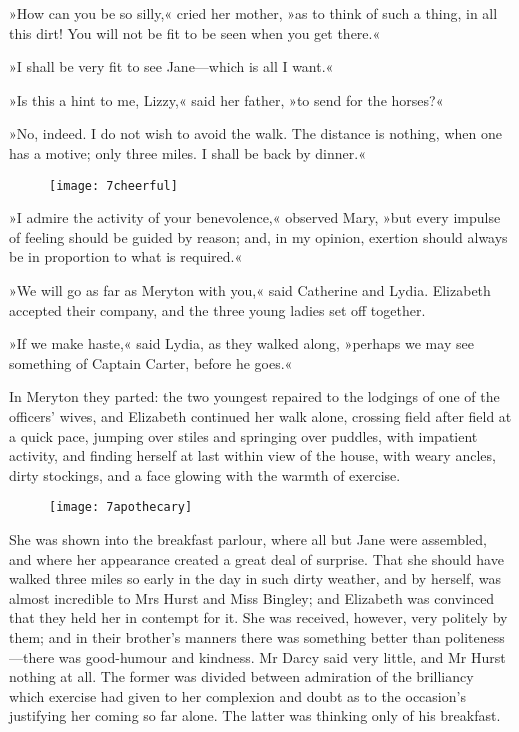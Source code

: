 »How can you be so silly,« cried her mother, »as to think of such a thing, in all this dirt! You will not be fit to be seen when you get there.«

»I shall be very fit to see Jane—which is all I want.«

»Is this a hint to me, Lizzy,« said her father, »to send for the horses?«

»No, indeed. I do not wish to avoid the walk. The distance is nothing, when one has a motive; only three miles. I shall be back by dinner.«

\begin{letter}
	\begin{figure}[tbh]
	\centering
	\texttt{[image: 7cheerful]}
	\end{figure}
\end{letter}

»I admire the activity of your benevolence,« observed Mary, »but every impulse of feeling should be guided by reason; and, in my opinion, exertion should always be in proportion to what is required.«

»We will go as far as Meryton with you,« said Catherine and Lydia. Elizabeth accepted their company, and the three young ladies set off together.



»If we make haste,« said Lydia, as they walked along, »perhaps we may see something of Captain Carter, before he goes.«

In Meryton they parted: the two youngest repaired to the lodgings of one of the officers' wives, and Elizabeth continued her walk alone, crossing field after field at a quick pace, jumping over stiles and springing over puddles, with impatient activity, and finding herself at last within view of the house, with weary ancles, dirty stockings, and a face glowing with the warmth of exercise.

	\begin{figure}[bh]
\centering
\texttt{[image: 7apothecary]}
\end{figure}

She was shown into the breakfast parlour, where all but Jane were assembled, and where her appearance created a great deal of surprise. That she should have walked three miles so early in the day in such dirty weather, and by herself, was almost incredible to Mrs Hurst and Miss Bingley; and Elizabeth was convinced that they held her in contempt for it. She was received, however, very politely by them; and in their brother's manners there was something better than politeness—there was good-humour and kindness. Mr Darcy said very little, and Mr Hurst nothing at all. The former was divided between admiration of the brilliancy which exercise had given to her complexion and doubt as to the occasion's justifying her coming so far alone. The latter was thinking only of his breakfast.

